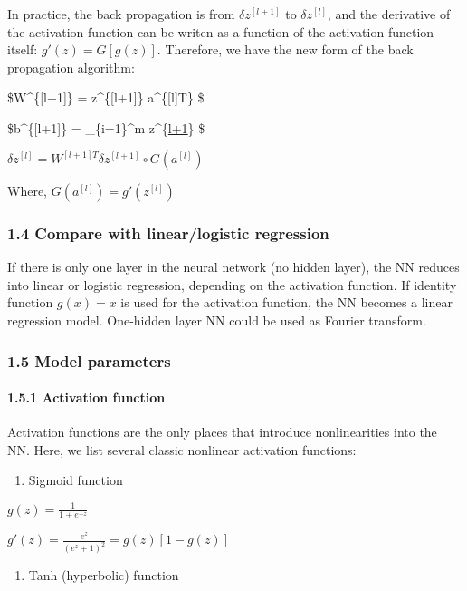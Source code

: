 \documentclass[11pt]{article}
\providecommand{\tightlist}{%
      \setlength{\itemsep}{0pt}\setlength{\parskip}{0pt}}
\begin{document}
In practice, the back propagation is from \(\delta z^{[l+1]}\) to
\(\delta z^{[l]}\), and the derivative of the activation function can be
writen as a function of the activation function itself:
\(g'(z) = G[g(z)]\). Therefore, we have the new form of the back
propagation algorithm:

\$\delta W\^{}\{{[}l+1{]}\} =  \delta z\^{}\{{[}l+1{]}\}
a\^{}\{{[}l{]}T\} \$

\$\delta b\^{}\{{[}l+1{]}\} =  \sum\_\{i=1\}\^{}m
\delta z\^{}\{\href{i}{l+1}\} \$

\(\delta z^{[l]} = W^{[l+1]T} \delta z^{[l+1]} \circ G(a^{[l]})\)

Where, \(G(a^{[l]}) = g'(z^{[l]})\)

\subsubsection{1.4 Compare with linear/logistic
regression}\label{compare-with-linearlogistic-regression}

If there is only one layer in the neural network (no hidden layer), the
NN reduces into linear or logistic regression, depending on the
activation function. If identity function \(g(x) = x\) is used for the
activation function, the NN becomes a linear regression model.
One-hidden layer NN could be used as Fourier transform.

\subsubsection{1.5 Model parameters}\label{model-parameters}

\paragraph{1.5.1 Activation function}\label{activation-function}

Activation functions are the only places that introduce nonlinearities
into the NN. Here, we list several classic nonlinear activation
functions:

\begin{enumerate}
\def\labelenumi{\alph{enumi})}
\tightlist
\item
  Sigmoid function
\end{enumerate}

\(g(z) = \frac {1} {1+e^{-z}}\)

\(g'(z) = \frac {e^z} {(e^z+1)^2} = g(z)[1-g(z)]\)

\begin{enumerate}
\def\labelenumi{\alph{enumi})}
\setcounter{enumi}{1}
\tightlist
\item
  Tanh (hyperbolic) function
\end{enumerate}
\end{document}
